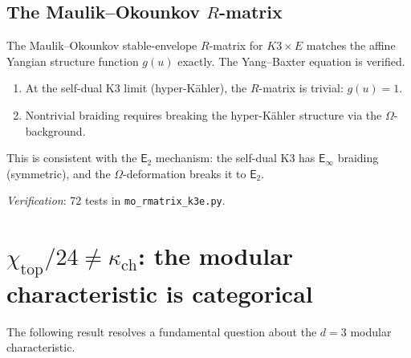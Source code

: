 \documentclass[11pt]{article}
\newcommand{\Etwo}{\mathsf{E}_2}
\newcommand{\Einf}{\mathsf{E}_{\infty}}
\begin{document}
\subsection{The Maulik--Okounkov $R$-matrix}
\label{subsec:k3e-mo-rmatrix}

\begin{proposition}
\label{prop:k3e-mo-rmatrix}
The Maulik--Okounkov stable-envelope $R$-matrix for $K3 \times E$ matches the affine Yangian structure function $g(u)$ exactly. The Yang--Baxter equation is verified.
\begin{enumerate}[label=\textup{(\roman*)}]
 \item At the self-dual K3 limit (hyper-K\"ahler), the $R$-matrix is trivial: $g(u) = 1$.
 \item Nontrivial braiding requires breaking the hyper-K\"ahler structure via the $\Omega$-background.
\end{enumerate}
This is consistent with the $\Etwo$ mechanism: the self-dual K3 has $\Einf$ braiding (symmetric), and the $\Omega$-deformation breaks it to $\Etwo$.

\noindent\textit{Verification}: 72 tests in \texttt{mo\_rmatrix\_k3e.py}.
\end{proposition}


\section{$\chi_{\mathrm{top}}/24 \neq \kappa_{\mathrm{ch}}$: the modular characteristic is categorical}
\label{sec:chi-neq-kappa}

The following result resolves a fundamental question about the $d = 3$ modular characteristic.
\end{document}

